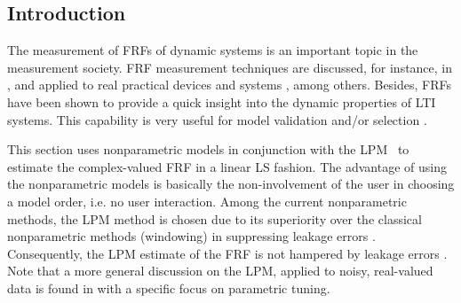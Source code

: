 




\subsection{Introduction}

The measurement of \glspl{FRF} of dynamic systems is an important topic in the measurement society.
\gls{FRF} measurement techniques are discussed, for instance, in
\citep{Schoukens1998ImprFRFmeas,Schoukens2006LPM,guillaume1996,broersen1995transferfunction,Pintelon2010LPM1,Antoni2007FRF,Pintelon2012}, and applied to real practical devices and systems \citep{Lim2010,Robinson1990,Behjat2010}, among others.
Besides, \glspl{FRF} have been shown to provide a quick insight into the dynamic properties of \gls{LTI} systems.
This capability is very useful for model validation and/or selection \citep{Pintelon2012}.

This section uses nonparametric models in conjunction with the \gls{LPM}~\citep{Pintelon2010LPM1} to estimate the complex-valued \gls{FRF} in a linear \gls{LS} fashion.
The advantage of using the nonparametric models is basically the non-involvement of the user in choosing a model order, i.e. no user interaction. Among the current nonparametric methods, the \gls{LPM} method is chosen due to its superiority over the classical nonparametric methods (windowing) in suppressing leakage errors \citep{Bendat1993,Oppenheim1983}. 
Consequently, the \gls{LPM} estimate of the \gls{FRF} is not hampered by leakage errors \citep{Pintelon2010LPM1,Schoukens2009LPM}. Note that a more general discussion on the \gls{LPM}, applied to noisy, real-valued data is found in \citep{Fan1996} with a specific focus on parametric tuning.

